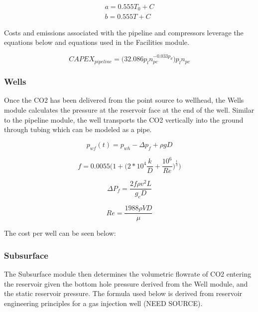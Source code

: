 \documentclass[balance,upint,subscriptcorrection,varvw,mathalfa=cal=boondoxo,spanish,french,vietnamese,russian,greek,pdf-a,colorlinks]{asmeconf}
\begin{document}
\begin{equation}
    \begin{array}{l}
        a = 0.555T_0+C \\
        b = 0.555T+C
    \end{array}
\end{equation}

Costs and emissions associated with the pipeline and compressors leverage the equations below and equations used in the Facilities module.

\begin{equation}
    CAPEX_{pipeline} = \bigg(32.086p_ln_{pc}^{-0.033p_d}\bigg)p_l n_{pc}
\end{equation}

\subsubsection{Wells}

Once the CO2 has been delivered from the point source to wellhead, the Wells module calculates the pressure at the reservoir face at the end of the well. Similar to the pipeline module, the well transports the CO2 vertically into the ground through tubing which can be modeled as a pipe. 

\begin{equation}
    p_{wf}(t) = p_{wh}-\Delta p_f + \rho gD
\end{equation}

\begin{equation}
    f = 0.0055\bigg(1+\bigg(2*10^4\frac{k}{D}+\frac{10^6}{Re}\bigg)^{\frac{1}{3}}\bigg)
\end{equation}

\begin{equation}
    \Delta P_f = \frac{2f\rho v^2L}{g_cD}
\end{equation}

\begin{equation}
    Re = \frac{1988\rho VD}{\mu}
\end{equation}

The cost per well can be seen below:

\subsubsection{Subsurface}

The Subsurface module then determines the volumetric flowrate of CO2 entering the reservoir given the bottom hole pressure derived from the Well module, and the static reservoir pressure. The formula used below is derived from reservoir engineering principles for a gas injection well (NEED SOURCE).
\end{document}
